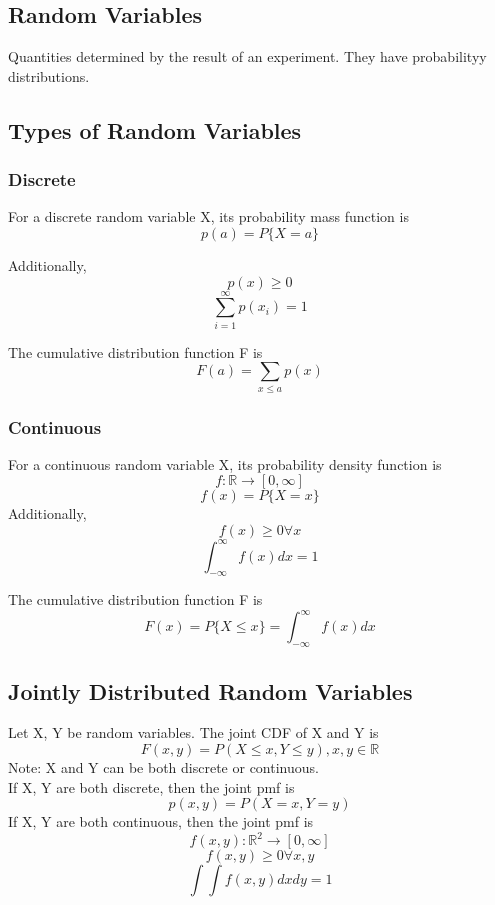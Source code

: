 \subsection{Random Variables}
\begin{defi}
    Quantities determined by the result of an experiment. They have probabilityy distributions.
\end{defi}
\subsection{Types of Random Variables}
\subsubsection{Discrete}
\begin{defi}
    For a discrete random variable X, its probability mass function is
    \[p(a) = P\{X=a\}\]

    Additionally, 
    \[p(x) \geq 0\]
    \[\sum_{i=1}^{\infty} p(x_i) = 1\]
\end{defi}
\begin{defi}
    The cumulative distribution function F is
    \[F(a) = \sum_{x\leq a}p(x)\]
\end{defi}
\subsubsection{Continuous}
\begin{defi}
    For a continuous random variable X, its probability density function is
    \[f:\mathbb{R}\rightarrow[0,\infty]\]
    \[f(x) = P\{X=x\}\]
    Additionally,
    \[f(x) \geq 0 \forall x\]
    \[\int_{-\infty}^{\infty}f(x)dx = 1\]
\end{defi}
\begin{defi}
    The cumulative distribution function F is
    \[F(x) = P\{X\leq x\} 
    = \int_{-\infty}^{\infty}f(x)dx\]
\end{defi}

\subsection{Jointly Distributed Random Variables}
Let X, Y be random variables. The joint CDF of X and Y is 
\[ F(x, y) = P(X\leq x, Y\leq y), x,y\in\mathbb{R} \]
Note: X and Y can be both discrete or continuous.\\

If X, Y are both discrete, then the joint pmf is
\[ p(x, y) = P(X=x, Y=y) \]
If X, Y are both continuous, then the joint pmf is
\[ f(x, y) : \mathbb{R}^2\rightarrow [0,\infty] \]
\[ f(x,y) \geq 0 \forall x,y \]
\[ \int \int f(x,y) dxdy = 1 \]

